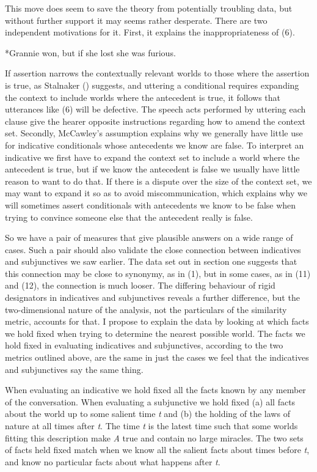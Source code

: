 \documentclass[
  11pt,
  letterpaper,
  DIV=11,
  numbers=noendperiod,
  twoside]{scrartcl}
\providecommand{\tightlist}{%
  \setlength{\itemsep}{0pt}\setlength{\parskip}{0pt}}
\begin{document}
This move does seem to save the theory from potentially troubling data,
but without further support it may seems rather desperate. There are two
independent motivations for it. First, it explains the inappropriateness
of (6).

\begin{description}
\tightlist
\item[(6)]
*Grannie won, but if she lost she was furious.
\end{description}

If assertion narrows the contextually relevant worlds to those where the
assertion is true, as Stalnaker ()
suggests, and uttering a conditional requires expanding the context to
include worlds where the antecedent is true, it follows that utterances
like (6) will be defective. The speech acts performed by uttering each
clause give the hearer opposite instructions regarding how to amend the
context set. Secondly, McCawley's assumption explains why we generally
have little use for indicative conditionals whose antecedents we know
are false. To interpret an indicative we first have to expand the
context set to include a world where the antecedent is true, but if we
know the antecedent is false we usually have little reason to want to do
that. If there is a dispute over the size of the context set, we may
want to expand it so as to avoid miscommunication, which explains why we
will sometimes assert conditionals with antecedents we know to be false
when trying to convince someone else that the antecedent really is
false.

So we have a pair of measures that give plausible answers on a wide
range of cases. Such a pair should also validate the close connection
between indicatives and subjunctives we saw earlier. The data set out in
section one suggests that this connection may be close to synonymy, as
in (1), but in some cases, as in (11) and (12), the connection is much
looser. The differing behaviour of rigid designators in indicatives and
subjunctives reveals a further difference, but the two-dimensional
nature of the analysis, not the particulars of the similarity metric,
accounts for that. I propose to explain the data by looking at which
facts we hold fixed when trying to determine the nearest possible world.
The facts we hold fixed in evaluating indicatives and subjunctives,
according to the two metrics outlined above, are the same in just the
cases we feel that the indicatives and subjunctives say the same thing.

When evaluating an indicative we hold fixed all the facts known by any
member of the conversation. When evaluating a subjunctive we hold fixed
(a) all facts about the world up to some salient time \emph{t} and (b)
the holding of the laws of nature at all times after \emph{t}. The time
\emph{t} is the latest time such that some worlds fitting this
description make \emph{A} true and contain no large miracles. The two
sets of facts held fixed match when we know all the salient facts about
times before \emph{t}, and know no particular facts about what happens
after \emph{t}.
\end{document}
